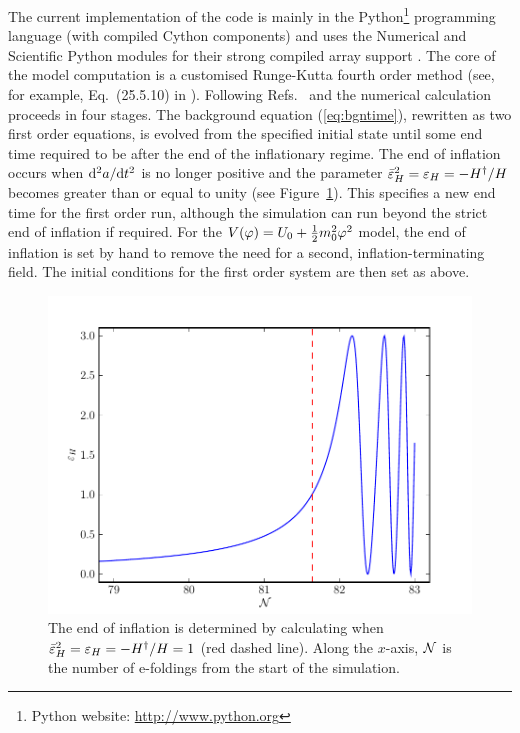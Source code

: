 The current implementation of the code is mainly in the Python\footnote{Python
website: \url{http://www.python.org}} programming language (with compiled Cython
components) and uses the
Numerical and Scientific Python modules for their strong compiled array support
\cite{scipy}. The core of the model computation is a customised
Runge-Kutta fourth order method (see, for example, Eq.~(25.5.10) in
\cite{abramowitz+stegun}).  Following
Refs.~\cite{Martin:2006rs} and \cite{Ringeval:2007am} the numerical calculation
proceeds in four stages. The background equation (\ref{eq:bgntime}),
rewritten as two first order equations, is
evolved from the specified initial state until some end time required
to be after the end of the inflationary regime.  The end of inflation
occurs when $\mathrm{d}^2a/\mathrm{d} t^2$ is no longer positive and the parameter
$\bar{\varepsilon}^2_H = \varepsilon_H= -H^{\dagger}/H$ becomes greater than or
equal to unity
(see Figure~\ref{fig:eps}). This specifies a new end time for the first
order run, although the simulation can run beyond the strict end of
inflation if required. For the $V(\varphi)=U_0 + \frac{1}{2} m_0^2 \varphi^2$ model, the end of inflation is
set by hand to remove the need for a second, inflation-terminating field. The initial
conditions for the first order system are then set as above.
%
\begin{figure}
\centering
 \includegraphics[width=\textwidth]{./numerical/graphs/bgepsilon}
 \caption[Plot of $\varepsilon_H$ near the end of inflation]{The end of
inflation is
determined by calculating when
   $\bar{\varepsilon}^2_H = \varepsilon_H=-H^{\dagger}/H=1$ (red dashed line). Along the
$x$-axis,
   $\mathcal{N}$ is the number of e-foldings from the start of the
   simulation.}
\label{fig:eps}
\end{figure}



